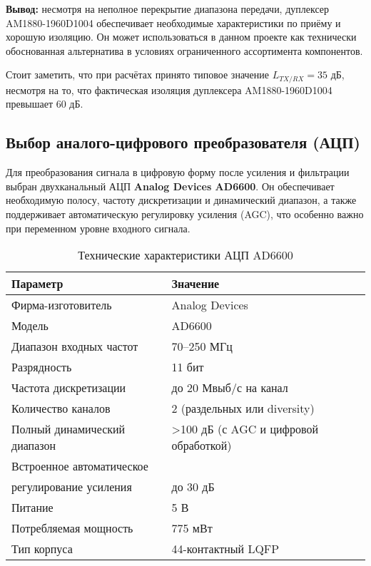 \documentclass[a4paper,12pt]{article}
\begin{document}
\textbf{Вывод:} несмотря на неполное перекрытие диапазона передачи, дуплексер AM1880-1960D1004 обеспечивает необходимые характеристики по приёму и хорошую изоляцию. Он может использоваться в данном проекте как технически обоснованная альтернатива в условиях ограниченного ассортимента компонентов.

Стоит заметить, что при расчётах принято типовое значение $L_{TX/RX} = 35$ дБ, несмотря на то, что фактическая изоляция дуплексера AM1880-1960D1004 превышает 60 дБ.


\subsection{Выбор аналого-цифрового преобразователя (АЦП)}

Для преобразования сигнала в цифровую форму после усиления и фильтрации выбран двухканальный АЦП \textbf{Analog Devices AD6600}. Он обеспечивает необходимую полосу, частоту дискретизации и динамический диапазон, а также поддерживает автоматическую регулировку усиления (AGC), что особенно важно при переменном уровне входного сигнала.

\begin{table}[H]
\centering
\caption{Технические характеристики АЦП AD6600}
\begin{tabular}{|l|l|}
\hline
\textbf{Параметр} & \textbf{Значение} \\ \hline
Фирма-изготовитель & Analog Devices \\ \hline
Модель & AD6600 \\ \hline
Диапазон входных частот & 70–250 МГц \\ \hline
Разрядность & 11 бит \\ \hline
Частота дискретизации & до 20 Мвыб/с на канал \\ \hline
Количество каналов & 2 (раздельных или diversity) \\ \hline
Полный динамический диапазон & >100 дБ (с AGC и цифровой обработкой) \\ \hline
Встроенное автоматическое\\ регулирование усиления & до 30 дБ \\ \hline
Питание & 5 В \\ \hline
Потребляемая мощность & 775 мВт \\ \hline
Тип корпуса & 44-контактный LQFP \\ \hline
\end{tabular}
\end{table}
\end{document}

